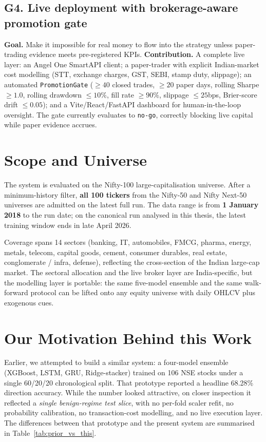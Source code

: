 \subsection*{G4. Live deployment with brokerage-aware promotion gate}
\textbf{Goal.} Make it impossible for real money to flow into the strategy unless paper-trading evidence meets pre-registered KPIs. \textbf{Contribution.} A complete live layer: an Angel One SmartAPI client; a paper-trader with explicit Indian-market cost modelling (STT, exchange charges, GST, SEBI, stamp duty, slippage); an automated \texttt{PromotionGate} (\(\geq 40\) closed trades, \(\geq 20\) paper days, rolling Sharpe \(\geq 1.0\), rolling drawdown \(\leq 10\%\), fill rate \(\geq 90\%\), slippage \(\leq 25\)bps, Brier-score drift \(\leq 0.05\)); and a Vite/React/FastAPI dashboard for human-in-the-loop oversight. The gate currently evaluates to \texttt{no-go}, correctly blocking live capital while paper evidence accrues.

\section{Scope and Universe}

The system is evaluated on the Nifty-100 large-capitalisation universe. After a minimum-history filter, \textbf{all 100 tickers} from the Nifty-50 and Nifty Next-50 universes are admitted on the latest full run. The data range is from \textbf{1 January 2018} to the run date; on the canonical run analysed in this thesis, the latest training window ends in late April 2026.

Coverage spans 14 sectors (banking, IT, automobiles, FMCG, pharma, energy, metals, telecom, capital goods, cement, consumer durables, real estate, conglomerate / infra, defense), reflecting the cross-section of the Indian large-cap market. The sectoral allocation and the live broker layer are India-specific, but the modelling layer is portable: the same five-model ensemble and the same walk-forward protocol can be lifted onto any equity universe with daily OHLCV plus exogenous cues.

\section{Our Motivation Behind this Work}

Earlier, we attempted to build a similar system: a four-model ensemble (XGBoost, LSTM, GRU, Ridge-stacker) trained on 106 NSE stocks under a single 60/20/20 chronological split. That prototype reported a headline 68.28\% direction accuracy. While the number looked attractive, on closer inspection it reflected a \emph{single benign-regime test slice}, with no per-fold scaler refit, no probability calibration, no transaction-cost modelling, and no live execution layer. The differences between that prototype and the present system are summarised in Table~\ref{tab:prior_vs_this}.

